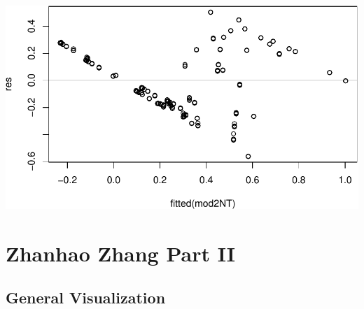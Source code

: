 \documentclass[
]{article}
\begin{document}
\includegraphics{main_files/figure-latex/unnamed-chunk-27-5.pdf}

\hypertarget{zhanhao-zhang-part-ii}{%
\section{Zhanhao Zhang Part II}\label{zhanhao-zhang-part-ii}}

\hypertarget{general-visualization}{%
\subsection{General Visualization}\label{general-visualization}}
\end{document}
